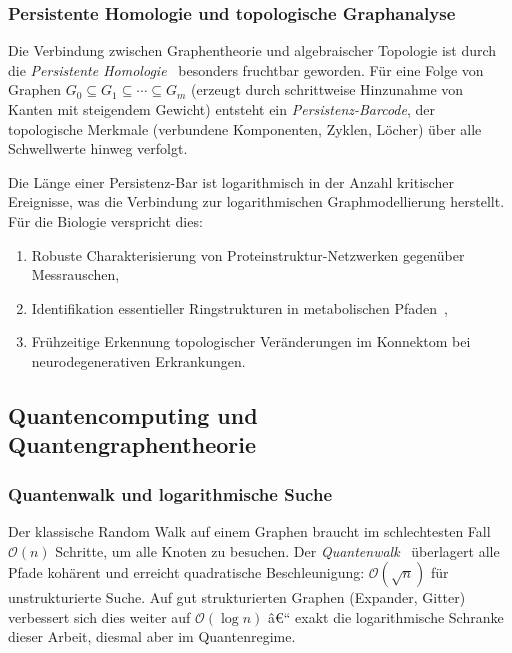 ﻿\documentclass[12pt,a4paper,twoside]{article}
\theoremstyle{definition}
\theoremstyle{plain}
\theoremstyle{remark}
\begin{document}
\subsubsection{Persistente Homologie und topologische Graphanalyse}

Die Verbindung zwischen Graphentheorie und algebraischer Topologie
ist durch die \emph{Persistente Homologie}~\cite{Edelsbrunner2002}
besonders fruchtbar geworden.  Für eine Folge von Graphen
$G_0 \subseteq G_1 \subseteq \cdots \subseteq G_m$ (erzeugt durch
schrittweise Hinzunahme von Kanten mit steigendem Gewicht) entsteht
ein \emph{Persistenz-Barcode}, der topologische Merkmale (verbundene
Komponenten, Zyklen, Löcher) über alle Schwellwerte hinweg verfolgt.

Die Länge einer Persistenz-Bar ist logarithmisch in der Anzahl
kritischer Ereignisse, was die Verbindung zur logarithmischen
Graphmodellierung herstellt.  Für die Biologie verspricht dies:
\begin{enumerate}
  \item Robuste Charakterisierung von Proteinstruktur-Netzwerken
        gegenüber Messrauschen,
  \item Identifikation essentieller Ringstrukturen in
        metabolischen Pfaden~\cite{Wagner2001},
  \item Frühzeitige Erkennung topologischer Veränderungen im
        Konnektom bei neurodegenerativen Erkrankungen.
\end{enumerate}

\subsection{Quantencomputing und Quantengraphentheorie}
\label{sub:quantum}

\subsubsection{Quantenwalk und logarithmische Suche}

Der klassische Random Walk auf einem Graphen braucht im
schlechtesten Fall $\mathcal{O}(n)$ Schritte, um alle Knoten
zu besuchen.  Der \emph{Quantenwalk}~\cite{Aharonov2001}
überlagert alle Pfade kohärent und erreicht quadratische
Beschleunigung: $\mathcal{O}(\sqrt{n})$ für unstrukturierte
Suche.  Auf gut strukturierten Graphen (Expander, Gitter)
verbessert sich dies weiter auf $\mathcal{O}(\log n)$
â€“ exakt die logarithmische Schranke dieser Arbeit, diesmal
aber im Quantenregime.
\end{document}
